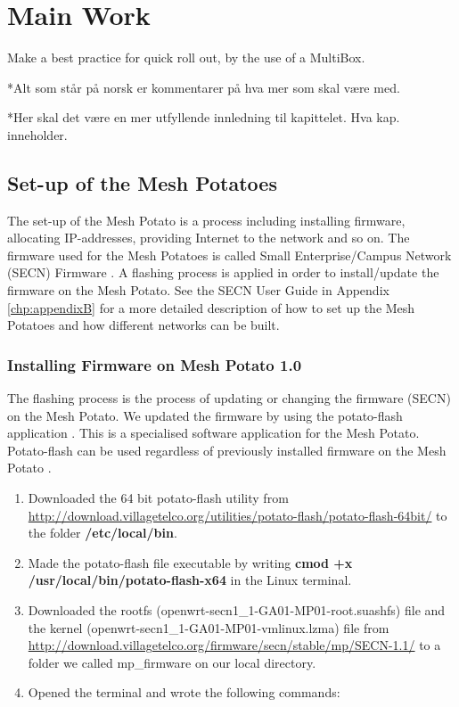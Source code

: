 \chapter{Main Work}
\label{chp:quickrollout} 

Make a best practice for quick roll out, by the use of a MultiBox. 

*Alt som står på norsk er kommentarer på hva mer som skal være med.

*Her skal det være en mer utfyllende innledning til kapittelet. Hva kap. inneholder.


\section{Set-up of the Mesh Potatoes}
The set-up of the Mesh Potato is a process including installing firmware, allocating IP-addresses, providing Internet to the network and so on. The firmware used for the Mesh Potatoes is called Small Enterprise/Campus Network (SECN) Firmware \cite{ChoosingFirmware}. A flashing process is applied in order to install/update the firmware on the Mesh Potato. See the SECN User Guide in Appendix \ref{chp:appendixB} for a more detailed description of how to set up the Mesh Potatoes and how different networks can be built. 

\subsection{Installing Firmware on Mesh Potato 1.0}

The flashing process is the process of updating or changing the firmware (SECN) on the Mesh Potato. We updated the firmware by using the potato-flash application \cite{flashing}. This is a specialised software application for the Mesh Potato. Potato-flash can be used regardless of previously installed firmware on the Mesh Potato \cite{InstallingSecnFirmware}. 

\begin{enumerate}
\item Downloaded the 64 bit potato-flash utility from \url{http://download.villagetelco.org/utilities/potato-flash/potato-flash-64bit/} to the folder \textbf{/etc/local/bin}.
\item Made the potato-flash file executable by writing \textbf{cmod +x /usr/local/bin/potato-flash-x64} in the Linux terminal.
\item Downloaded the rootfs (openwrt-secn1_1-GA01-MP01-root.suashfs) file and the kernel (openwrt-secn1_1-GA01-MP01-vmlinux.lzma) file from \url{http://download.villagetelco.org/firmware/secn/stable/mp/SECN-1.1/} to a folder we called mp\_firmware on our local directory.
\item Opened the terminal and wrote the following commands: 
\end{enumerate}


